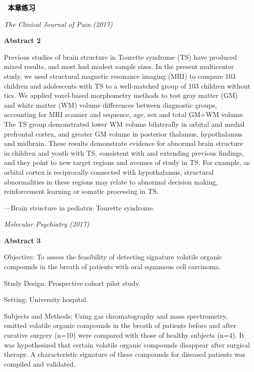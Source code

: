 \documentclass[a4paper]{ctexbook}
\newenvironment{problemset}[1][本章练习]{
  \begin{center}
    \phantomsection\addcontentsline{toc}{section}{\texorpdfstring{本章练习}{Exercice}}
    \markright{#1}
    \textcolor{black}{\Large\bfseries\adftripleflourishleft~#1~\adftripleflourishright}
  \end{center}
  \begin{enumerate}}{
  \end{enumerate}}
\begin{document}
\begin{problemset}
\begin{flushright}
      \emph{The Clinical Journal of Pain (2017)}
    \end{flushright}

    \textbf{Abstract 2}

    \hspace*{2em}Previous studies of brain structure in Tourette syndrome (TS) have produced mixed results, and most had modest sample sizes. In the present multicenter study, we used structural magnetic resonance imaging (MRI) to compare 103 children and adolescents with TS to a well-matched group of 103 children without tics. We applied voxel-based morphometry methods to test gray matter (GM) and white matter (WM) volume differences between diagnostic groups, accounting for MRI scanner and sequence, age, sex and total GM$+$WM volume. The TS group demonstrated lower WM volume bilaterally in orbital and medial prefrontal cortex, and greater GM volume in posterior thalamus, hypothalamus and midbrain. These results demonstrate evidence for abnormal brain structure in children and youth with TS, consistent with and extending previous findings, and they point to new target regions and avenues of study in TS. For example, as orbital cortex is reciprocally connected with hypothalamus, structural abnormalities in these regions may relate to abnormal decision making, reinforcement learning or somatic processing in TS.

    \begin{flushright}
      ---Brain structure in pediatric Tourette syndrome. 

      \emph{Molecular Psychiatry (2017)}
    \end{flushright}

    \textbf{Abstract 3}

    \hspace*{2em}Objective: To assess the feasibility of detecting signature volatile organic compounds in the breath of patients with oral squamous cell carcinoma.
    
    \hspace*{2em}Study Design: Prospective cohort pilot study.
    
    \hspace*{2em}Setting: University hospital.
    
    \hspace*{2em}Subjects and Methods: Using gas chromatography and mass spectrometry, emitted volatile organic compounds in the breath of patients before and after curative surgery (n=10) were compared with those of healthy subjects (n=4). It was hypothesized that certain volatile organic compounds disappear after surgical therapy. A characteristic signature of these compounds for diseased patients was compiled and validated.
    

\end{problemset}
\end{document}
